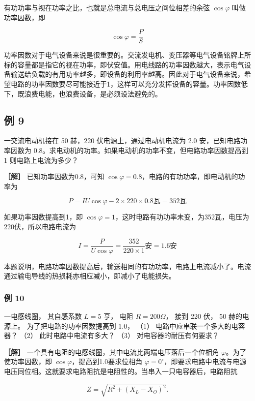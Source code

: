 有功功率与视在功率之比，也就是总电流与总电压之间位相差的余弦
\(\cos\varphi\) 叫做功率因数，即

\[
\cos \varphi = \frac{P}{S} \tag{5.26}
\]

功率因数对于电气设备来说是很重要的。交流发电机、变压器等电气设备铭牌上所标的容量都是指它的视在功率，即伏安值。用电线路的功率因数越大，表示电气设备输送给负载的有用功率越多，即设备的利用率越高。因此对于电气设备来说，希望电路的功率因数要尽可能接近于1，这样可以充分发挥设备的容量。功率因数低下，既浪费电能，也浪费设备，是必须设法避免的。

\subsection{例 9}\label{ux4f8b-9-2}

一交流电动机接在 50 赫，220 伏电源上，通过电动机电流为 2.0
安，已知电路功率因数为
0.8。求电动机的功率。如果电动机的功率不变，但电路功率因数提高到 1
则电路上电流为多少？

\textbf{［解］} 已知功率因数为0.8，可知
\(\cos \varphi = 0.8\)，电路的有功功率，即电动机的功率为

\[
P = I U \cos \varphi - 2 \times 220 \times 0.8 \text{瓦} = 352 \text{瓦}
\]

如果功率因数提高到1，即
\(\cos \varphi = 1\)，这时电路有功功率未变，为352瓦，电压为220伏，所以电路电流为

\[
I = \frac{P}{U \cos \varphi} = \frac{352}{220 \times 1} \text{安} = 1.6 \text{安}
\]

本题说明，电路功率因数提高后，输送相同的有功功率，电路上电流减小了。电流通过输电导线的热损耗亦相应减小，即减小了电能损失。

\subsubsection{例 10}\label{ux4f8b-10-2}

一电感线圈， 其自感系数 \(L = 5\) 亨， 电阻 \(R = 200\Omega\)， 接到 220
伏， 50 赫的电源上。 为了把电路的功率因数提高到 1.0， （1）
电路中应串联一个多大的电容器？ （2） 此时电路中电流有多大？ （3）
对电容器的耐压有何要求？

\textbf{［解］} 一个具有电阻的电感线圈，其中电流比两端电压落后一个位相角
\(\varphi\)。为了使功率因数，即 \(\cos \varphi\)，提高到1.0要求位相角
\(\varphi = 0^{\circ}\)，即要求电路中电流与电源电压同位相。这就要求电路阻抗是电阻性的。当串入一只电容器后，电路阻抗

\[
Z = \sqrt{R^{2} + (X_{L} - X_{O})^{2}}.
\]

